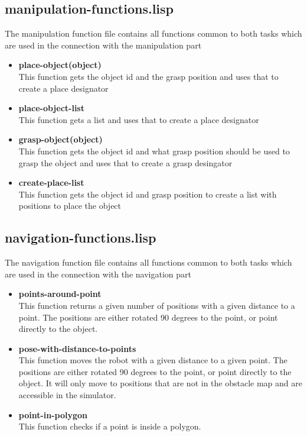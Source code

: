 \documentclass[main.tex]{subfiles}
\begin{document}
	    \subsection{manipulation-functions.lisp}
	    The manipulation function file contains all functions common to both tasks which are used in the connection with the manipulation part
	    \begin{itemize}
	    \item \textbf{place-object(object)} \\
	    This function gets the object id and the grasp position and uses that to create a place designator  
		\item \textbf{place-object-list} \\
		This function gets a list and uses that to create a place designator 
	    \item \textbf{grasp-object(object)} \\
	    This function gets the object id and what grasp position should be used to grasp the object and uses that to create a grasp desingator
	    \item \textbf{create-place-list} \\
	    This function gets the object id and grasp position to create a list with positions to place the object
		\end{itemize}
	    \subsection{navigation-functions.lisp}
	    The navigation function file contains all functions common to both tasks which are used in the connection with the navigation part
	    \begin{itemize}
	    	\item \textbf{points-around-point} \\
	    	This function returns a given number of positions with a given 	distance to a point. The positions are either rotated 90 degrees to the point, or point directly to the object.
	    	\item \textbf{pose-with-distance-to-points} \\
	    	This function moves the robot with a given distance to a given point. The positions are either rotated 90 degrees to the point, or point directly to the object. It will only move to positions that are not in the obstacle map and are accessible in the simulator.
	    	\item \textbf{point-in-polygon} \\
			This function checks if a point is inside a polygon.
	    \end{itemize}
\end{document}
